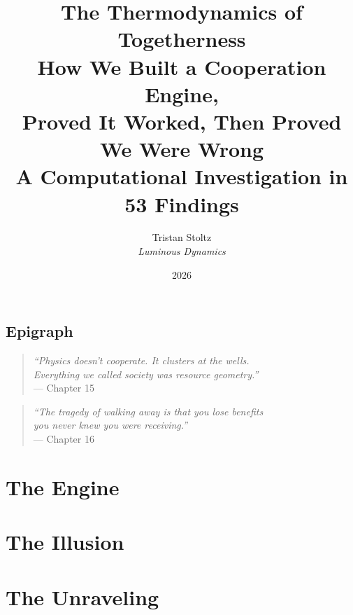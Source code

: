 \documentclass[12pt,a4paper]{book}
\title{\textbf{\Huge The Thermodynamics of Togetherness}\\[1em]
\Large How We Built a Cooperation Engine,\\Proved It Worked, Then Proved We Were Wrong\\[2em]
\large A Computational Investigation in 53 Findings}
\author{Tristan Stoltz\\[0.5em]\textit{Luminous Dynamics}}
\date{2026}
\begin{document}
\frontmatter
\maketitle

\chapter*{Epigraph}
\begin{quote}
\textit{``Physics doesn't cooperate. It clusters at the wells.\\Everything we called society was resource geometry.''}\\[1em]
--- Chapter 15
\end{quote}

\vfill

\begin{quote}
\textit{``The tragedy of walking away is that you lose benefits\\you never knew you were receiving.''}\\[1em]
--- Chapter 16
\end{quote}

\tableofcontents

\mainmatter

\part{The Engine}






\part{The Illusion}











\part{The Unraveling}





\end{document}
